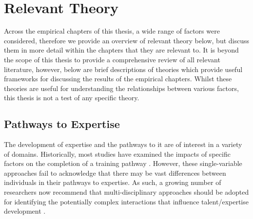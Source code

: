 \documentclass[
  12pt,
  a4paper,
]{book}
\begin{document}
\hypertarget{relevant-theory}{%
\section{Relevant Theory}\label{relevant-theory}}

Across the empirical chapters of this thesis, a wide range of factors were considered, therefore we provide an overview of relevant theory below, but discuss them in more detail within the chapters that they are relevant to.
It is beyond the scope of this thesis to provide a comprehensive review of all relevant literature, however, below are brief descriptions of theories which provide useful frameworks for discussing the results of the empirical chapters. Whilst these theories are useful for understanding the relationships between various factors, this thesis is not a test of any specific theory.

\hypertarget{pathways-to-expertise}{%
\subsection{Pathways to Expertise}\label{pathways-to-expertise}}

The development of expertise and the pathways to it are of interest in a variety of domains. Historically, most studies have examined the impacts of specific factors on the completion of a training pathway \citep[e.g., delays in completing PhDs;][]{VandeSchoot2013a}. However, these single-variable approaches fail to acknowledge that there may be vast differences between individuals in their pathways to expertise. As such, a growing number of researchers now recommend that multi-disciplinary approaches should be adopted for identifying the potentially complex interactions that influence talent/expertise development \citep[e.g.,][]{Abernethy2013, Gullich2019, Johnston2018, Pearson2006, Rees2016, Schorer2013}.
\end{document}
